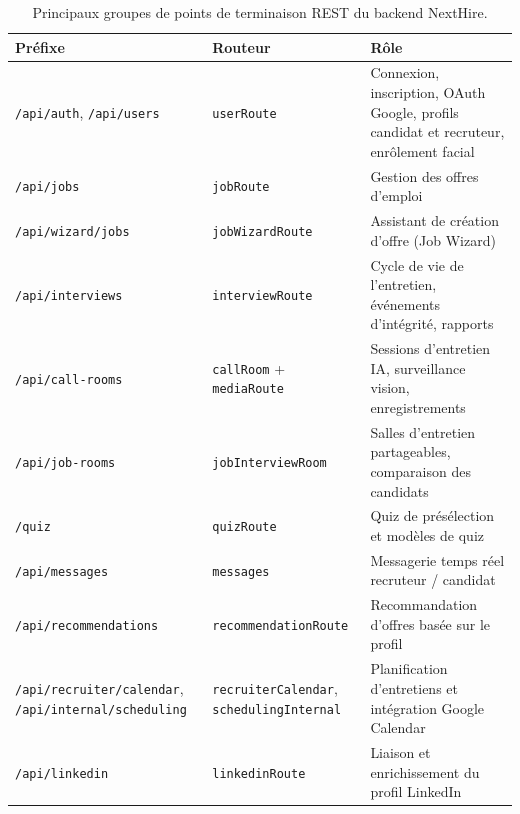 \begin{table}[H]
  \centering
  \footnotesize
  \renewcommand{\arraystretch}{1.3}
  \setlength{\tabcolsep}{5pt}
  \begin{tabularx}{\textwidth}{|>{\raggedright\arraybackslash}p{3.6cm}|>{\raggedright\arraybackslash}p{3.4cm}|>{\raggedright\arraybackslash}X|}
    \hline
    \rowcolor{blue!10}
    \textbf{Préfixe} & \textbf{Routeur} & \textbf{Rôle} \\
    \hline
    \texttt{/api/auth}, \texttt{/api/users} & \texttt{userRoute} & Connexion, inscription, OAuth Google, profils candidat et recruteur, enrôlement facial \\
    \hline
    \texttt{/api/jobs} & \texttt{jobRoute} & Gestion des offres d'emploi \\
    \hline
    \texttt{/api/wizard/jobs} & \texttt{jobWizardRoute} & Assistant de création d'offre (Job Wizard) \\
    \hline
    \texttt{/api/interviews} & \texttt{interviewRoute} & Cycle de vie de l'entretien, événements d'intégrité, rapports \\
    \hline
    \texttt{/api/call-rooms} & \texttt{callRoom} + \texttt{mediaRoute} & Sessions d'entretien IA, surveillance vision, enregistrements \\
    \hline
    \texttt{/api/job-rooms} & \texttt{jobInterviewRoom} & Salles d'entretien partageables, comparaison des candidats \\
    \hline
    \texttt{/quiz} & \texttt{quizRoute} & Quiz de présélection et modèles de quiz \\
    \hline
    \texttt{/api/messages} & \texttt{messages} & Messagerie temps réel recruteur / candidat \\
    \hline
    \texttt{/api/recommendations} & \texttt{recommendationRoute} & Recommandation d'offres basée sur le profil \\
    \hline
    \texttt{/api/recruiter/calendar}, \texttt{/api/internal/scheduling} & \texttt{recruiterCalendar}, \texttt{schedulingInternal} & Planification d'entretiens et intégration Google Calendar \\
    \hline
    \texttt{/api/linkedin} & \texttt{linkedinRoute} & Liaison et enrichissement du profil LinkedIn \\
    \hline
  \end{tabularx}
  \caption{Principaux groupes de points de terminaison REST du backend NextHire.}
  \label{tab:api-groups}
\end{table}

